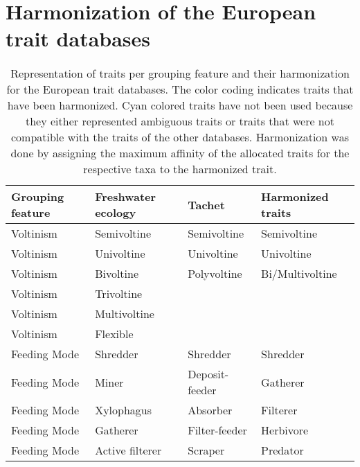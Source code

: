 \documentclass[../Draft_harmonization_paper.tex]{subfiles}
\begin{document}
\newpage

\section*{Harmonization of the European trait databases}
\label{sec:SI_harmonization_EU}

\begin{longtable}{lll|l}
    \caption{Representation of traits per grouping feature and their harmonization for the European trait databases. The color coding indicates traits that have been harmonized. Cyan colored traits have not been used because they either represented ambiguous traits or traits that were not compatible with the traits of the other databases. Harmonization was done by assigning the maximum affinity of the allocated traits for the respective taxa to the harmonized trait.}
    \endfirsthead
    \endhead
    \hline
    Grouping feature & Freshwater ecology & Tachet & Harmonized traits \\ 
    \hline
    \hline
    Voltinism & Semivoltine & Semivoltine & Semivoltine \\ 
    Voltinism & Univoltine & Univoltine & Univoltine \\ 
    \rowcolor{gray!25}
    Voltinism & Bivoltine & Polyvoltine & Bi/Multivoltine \\ 
    \cellcolor{gray!25}Voltinism & \cellcolor{gray!25}Trivoltine &  &  \\ 
    \cellcolor{gray!25}Voltinism & \cellcolor{gray!25}Multivoltine &  &  \\ 
    \cellcolor{gray!25}Voltinism & \cellcolor{gray!25}Flexible &  &  \\ 
    \rowcolor{blue!25}
    \cellcolor{blue!25}Feeding Mode & \cellcolor{blue!25}Shredder & Shredder & Shredder \\ 
    \cellcolor{blue!25}Feeding Mode & \cellcolor{blue!25}Miner & Deposit-feeder & Gatherer \\ 
    \cellcolor{blue!25}Feeding Mode & \cellcolor{blue!25}Xylophagus & \cellcolor{blue!50}Absorber & \cellcolor{blue!50}Filterer \\ 
    Feeding Mode & Gatherer & \cellcolor{blue!50}Filter-feeder & Herbivore \\ 
    \cellcolor{blue!50}Feeding Mode & \cellcolor{blue!50}Active filterer & Scraper & Predator \\ 

\end{longtable}
\end{document}
